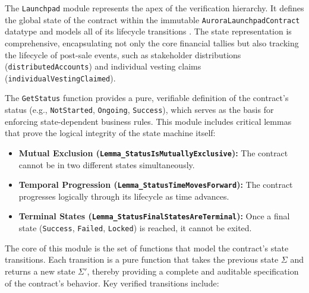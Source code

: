 \documentclass[
  english,
  onecolumn]{article}
\providecommand{\tightlist}{%
  \setlength{\itemsep}{0pt}\setlength{\parskip}{0pt}}
\begin{document}
The \texttt{Launchpad} module represents the apex of the verification
hierarchy. It defines the global state of the contract within the
immutable \texttt{AuroraLaunchpadContract} datatype and models all of
its lifecycle transitions .
The state representation is comprehensive, encapsulating not only the
core financial tallies but also tracking the lifecycle of post-sale
events, such as stakeholder distributions (\texttt{distributedAccounts})
and individual vesting claims (\texttt{individualVestingClaimed}).

The \texttt{GetStatus} function provides a pure, verifiable definition
of the contract's status (e.g., \texttt{NotStarted}, \texttt{Ongoing},
\texttt{Success}), which serves as the basis for enforcing
state-dependent business rules. This module includes critical lemmas
that prove the logical integrity of the state machine itself:

\begin{itemize}
\tightlist
\item
  \textbf{Mutual Exclusion (\texttt{Lemma\_StatusIsMutuallyExclusive}):}
  The contract cannot be in two different states simultaneously.
\item
  \textbf{Temporal Progression
  (\texttt{Lemma\_StatusTimeMovesForward}):} The contract progresses
  logically through its lifecycle as time advances.
\item
  \textbf{Terminal States
  (\texttt{Lemma\_StatusFinalStatesAreTerminal}):} Once a final state
  (\texttt{Success}, \texttt{Failed}, \texttt{Locked}) is reached, it
  cannot be exited.
\end{itemize}

The core of this module is the set of functions that model the
contract's state transitions. Each transition is a pure function that
takes the previous state \(\Sigma\) and returns a new state \(\Sigma'\),
thereby providing a complete and auditable specification of the
contract's behavior. Key verified transitions include:
\end{document}
